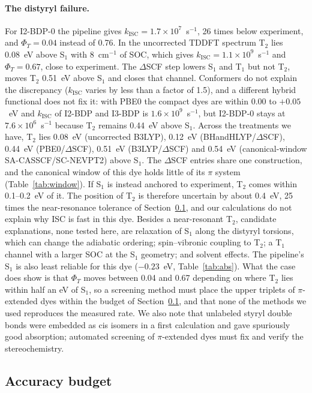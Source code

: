 \documentclass[journal=jctcce,manuscript=article,layout=twocolumn]{achemso}
\newcommand{\kisc}{k_\mathrm{ISC}}
\begin{document}
\paragraph{The distyryl failure.} For I2-BDP-0 the pipeline gives
$\kisc=1.7\times10^{7}$~s$^{-1}$, 26 times below experiment, and $\Phi_T=0.04$ instead of 0.76. In the
uncorrected TDDFT spectrum T$_2$ lies 0.08~eV above S$_1$ with 8~cm$^{-1}$ of SOC, which gives
$\kisc=1.1\times10^{9}$~s$^{-1}$ and $\Phi_T=0.67$, close to experiment. The $\Delta$SCF step lowers
S$_1$ and T$_1$ but not T$_2$, moves T$_2$ 0.51~eV above S$_1$ and closes that channel. Conformers do not
explain the discrepancy ($\kisc$ varies by less than a factor of 1.5), and a different hybrid
functional does not fix it: with PBE0 the compact dyes are within 0.00 to $+0.05$~eV and $\kisc$ of
I2-BDP and I3-BDP is $1.6\times10^{9}$~s$^{-1}$, but I2-BDP-0 stays at $7.6\times10^{6}$~s$^{-1}$
because T$_2$ remains 0.44~eV above S$_1$. Across the treatments we have, T$_2$ lies 0.08~eV (uncorrected B3LYP), 0.12~eV
(BHandHLYP/$\Delta$SCF), 0.44~eV (PBE0/$\Delta$SCF), 0.51~eV (B3LYP/$\Delta$SCF) and 0.54~eV
(canonical-window SA-CASSCF/SC-NEVPT2) above S$_1$. The $\Delta$SCF entries share one construction, and the
canonical window of this dye holds little of its $\pi$ system (Table~\ref{tab:window}). If S$_1$ is instead
anchored to experiment, T$_2$ comes within 0.1--0.2~eV of it. The position of T$_2$ is therefore uncertain by
about 0.4~eV, 25 times the near-resonance tolerance of Section~\ref{sec:budget}, and our calculations do not
explain why ISC is fast in this dye. Besides a near-resonant T$_2$, candidate explanations, none tested here, are relaxation of S$_1$ along the distyryl
torsions, which can change the adiabatic ordering; spin--vibronic coupling to T$_2$; a T$_1$ channel
with a larger SOC at the S$_1$ geometry; and solvent effects. The pipeline's S$_1$ is also least reliable
for this dye ($-0.23$~eV, Table~\ref{tab:abs}). What the case does show is that $\Phi_T$ moves between
0.04 and 0.67 depending on where T$_2$ lies within half an eV of S$_1$, so a screening method must place
the upper triplets of $\pi$-extended dyes within the budget of Section~\ref{sec:budget}, and that none of
the methods we used reproduces the measured rate. We also note that unlabeled
styryl double bonds were embedded as cis isomers in a first calculation and gave spuriously good
absorption; automated screening of $\pi$-extended dyes must fix and verify the stereochemistry.

\subsection{Accuracy budget}
\label{sec:budget}
\end{document}

